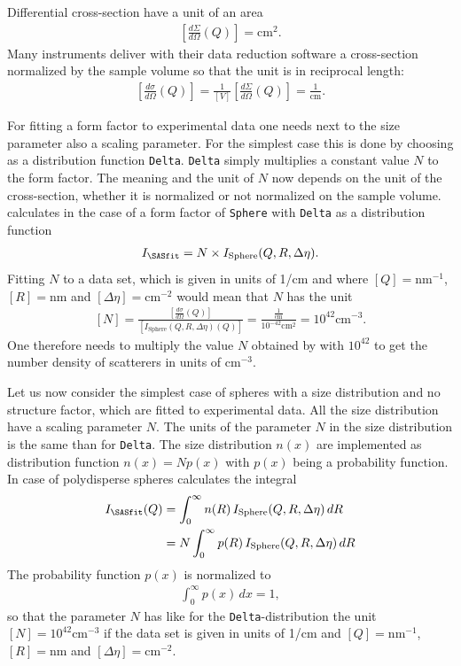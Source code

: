 Differential cross-section have a unit of an area
\begin{align}
\left[\frac{d\Sigma}{d\Omega}(Q)\right] = \textrm{cm}^2.
\end{align}
Many instruments deliver with their data reduction software a
cross-section normalized by the sample volume so that the unit is in
reciprocal length:
\begin{align}
\left[\frac{d\sigma}{d\Omega}(Q)\right]
= \frac{1}{\left[V\right]}\left[\frac{d\Sigma}{d\Omega}(Q)\right]
= \frac{1}{\textrm{cm}}
.
\end{align}

For fitting a form factor to experimental data one needs next to the size parameter also a
scaling parameter. For the simplest case this is done by choosing as a distribution function
\texttt{Delta}. \texttt{Delta} simply multiplies a constant value $N$ to the form factor.
The meaning and the unit of $N$ now depends on the unit of the cross-section, whether it is
normalized or not normalized on the sample volume. \SASfit calculates in the case of
a form factor of \texttt{Sphere} with \texttt{Delta} as a distribution function
\begin{align}
I_\text{\SASfit} = N \times I_\text{Sphere}(Q,R,\Delta\eta).
\end{align}
Fitting $N$ to a data set, which is given in units of 1/cm and where $[Q]=\textrm{nm}^{-1}$, $[R]=\textrm{nm}$
and $[\Delta\eta]=\textrm{cm}^{-2}$ would mean that $N$ has the unit
\begin{align}
\left[ N \right] = \frac{\left[\frac{d\sigma}{d\Omega}(Q)\right]}{\left[I_\text{Sphere}(Q,R,\Delta\eta)(Q)\right]}
= \frac{\frac{1}{\textrm{cm}}}{10^{-42}\textrm{cm}^2} = 10^{42} \textrm{cm}^{-3}.
\end{align}
One therefore needs to multiply the value $N$ obtained by \SASfit
with $10^{42}$ to get the number density of scatterers in units of cm$^{-3}$.

Let us now consider the simplest case of spheres with a size distribution and no structure factor,
which are fitted to experimental data. All the size distribution have a scaling parameter $N$.
The units of the parameter $N$ in the size distribution is the same than for \texttt{Delta}.
The size distribution $n(x)$ are implemented as distribution function $n(x) = N p(x)$ with $p(x)$
being a probability function. In case of polydisperse spheres \SASfit calculates the integral
\begin{align}
I_\text{\SASfit} (Q)
&= \int_0^\infty n(R) \, I_\text{Sphere}(Q,R,\Delta\eta) \, dR \\
&= N \int_0^\infty p(R) \, I_\text{Sphere}(Q,R,\Delta\eta) \, dR
\end{align}
The probability function $p(x)$ is normalized to
\begin{align}
\int_0^\infty p(x) \, dx = 1,
\end{align}
so that the parameter $N$ has like for the
\texttt{Delta}-distribution the unit $\left[ N \right]= 10^{42}
\textrm{cm}^{-3}$ if the data set is given in units of 1/cm and
$[Q]=\textrm{nm}^{-1}$, $[R]=\textrm{nm}$ and
$[\Delta\eta]=\textrm{cm}^{-2}$.

